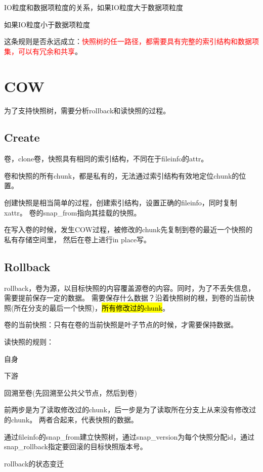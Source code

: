 IO粒度和数据项粒度的关系，如果IO粒度大于数据项粒度

如果IO粒度小于数据项粒度

这条规则是否永远成立：\textcolor{red}{快照树的任一路径，都需要具有完整的索引结构和数据项集，可以有冗余和共享}。

\section{COW}

为了支持快照树，需要分析rollback和读快照的过程。

\subsection{Create}

卷，clone卷，快照具有相同的索引结构，不同在于fileinfo的attr。

卷和快照的所有chunk，都是私有的，无法通过索引结构有效地定位chunk的位置。

创建快照是相当简单的过程，创建索引结构，设置正确的fileinfo，同时复制xattr。
卷的snap\_from指向其挂载的快照。

在写入卷的时候，发生COW过程，被修改的chunk先复制到卷的最近一个快照的私有存储空间里，
然后在卷上进行in place写。

\subsection{Rollback}

rollback，卷为源，以目标快照的内容覆盖源卷的内容。同时，为了不丢失信息，需要提前保存一定的数据。
需要保存什么数据？沿着快照树的根，到卷的当前快照(所在分支的最后一个快照)，\hl{所有修改过的chunk}。

卷的当前快照：只有在卷的当前快照是叶子节点的时候，才需要保持数据。

读快照的规则：
\begin{compactenum}
\item 自身
\item 下游
\item 回溯至卷(先回溯至公共父节点，然后到卷)
\end{compactenum}

前两步是为了读取修改过的chunk，后一步是为了读取所在分支上从来没有修改过的chunk。
两者合起来，代表快照的数据。

通过fileinfo的snap\_from建立快照树，通过snap\_version为每个快照分配id，通过snap\_rollback指定要回滚的目标快照版本号。

rollback的状态变迁

